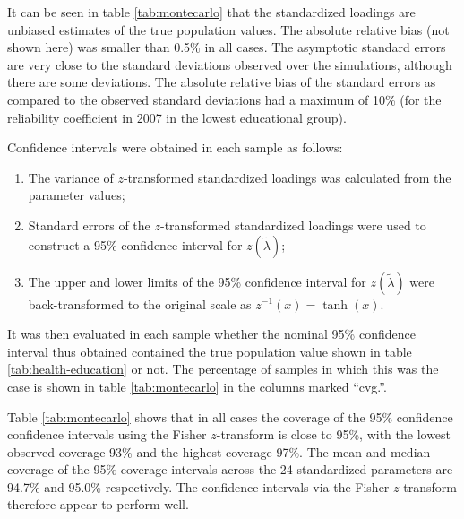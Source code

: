 \documentclass[a4paper,11pt]{article}
\renewcommand{\l}{\lambda}
\newcommand{\0}{\boldsymbol{0}}
\begin{document}
It can be seen in table \ref{tab:montecarlo} that the standardized loadings are unbiased estimates of the
 true population values. The absolute relative bias (not shown here) was smaller than 0.5\% in all cases.
The asymptotic standard errors are very close to the standard deviations observed over the simulations, 
although there are some deviations. 
The absolute relative bias of the standard errors as compared to the observed standard deviations 
had a maximum of 10\% (for the reliability coefficient in 2007 in the lowest educational group). 

Confidence intervals were obtained in each sample as follows: 
\begin{enumerate}
\item  The variance of $z$-transformed standardized loadings was calculated from the parameter values;
\item Standard errors of the $z$-transformed standardized loadings were used to construct a 95\%
		confidence interval for $z(\tilde\l)$;
\item The upper and lower limits of the 95\% confidence interval for $z(\tilde\l)$ were back-transformed
		to the original scale as $z^{-1}(x) = \tanh(x)$.%
\end{enumerate}
It was then evaluated in each sample whether the nominal 95\% confidence interval thus obtained contained the true population
value shown in table \ref{tab:health-education} or not. The percentage of samples in which this was the case is 
shown in table \ref{tab:montecarlo} in the columns marked ``cvg.''. 

Table \ref{tab:montecarlo} shows that in all cases the coverage of the 95\% confidence confidence 
intervals using the Fisher $z$-transform is close to 95\%, with the lowest observed coverage 93\%  
and the highest coverage 97\%. The mean and median coverage of the 95\% coverage intervals 
across the 24 standardized parameters are 94.7\% and 95.0\% respectively. The confidence intervals via the Fisher
$z$-transform therefore appear to perform well.
\end{document}
